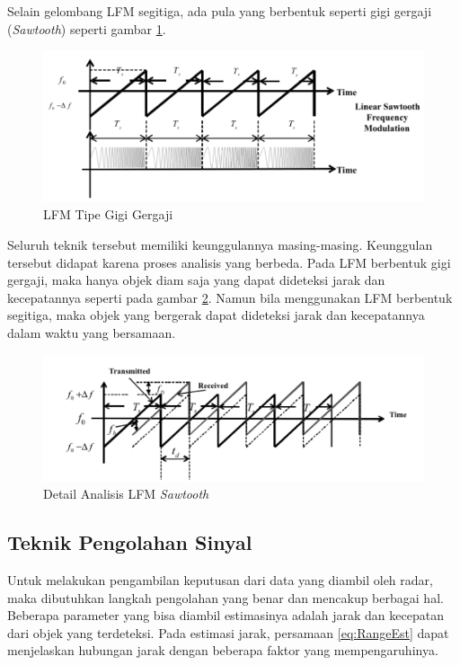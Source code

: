 Selain gelombang LFM segitiga, ada pula yang berbentuk seperti gigi gergaji (\textit{Sawtooth}) seperti gambar \ref{pic:lfmSaw}.

\begin{figure}
	\begin{center}
		\includegraphics[scale=0.65]{pics/bab2/lfmSawtooth.png}
		\caption[LFM Tipe Gigi Gergaji]{LFM Tipe Gigi Gergaji \cite{Jankiraman2018}}
		\label{pic:lfmSaw}
	\end{center}
\end{figure}

Seluruh teknik tersebut memiliki keunggulannya masing-masing. Keunggulan tersebut didapat karena proses analisis yang berbeda. Pada LFM berbentuk gigi gergaji, maka hanya objek diam saja yang dapat dideteksi jarak dan kecepatannya seperti pada gambar \ref{pic:lfmDetail}. Namun bila menggunakan LFM berbentuk segitiga, maka objek yang bergerak dapat dideteksi jarak dan kecepatannya dalam waktu yang bersamaan.

\begin{figure}
	\begin{center}
		\includegraphics[scale=0.65]{pics/bab2/lfmDetail.png}
		\caption[Detail Analisis LFM \textit{Sawtooth}]{Detail Analisis LFM \textit{Sawtooth} \cite{Jankiraman2018}}
		\label{pic:lfmDetail}
	\end{center}
\end{figure}


\subsection{Teknik Pengolahan Sinyal}
Untuk melakukan pengambilan keputusan dari data yang diambil oleh radar, maka dibutuhkan langkah pengolahan yang benar dan mencakup berbagai hal. Beberapa parameter yang bisa diambil estimasinya adalah jarak dan kecepatan dari objek yang terdeteksi. Pada estimasi jarak, persamaan \ref{eq:RangeEst} dapat menjelaskan hubungan jarak dengan beberapa faktor yang mempengaruhinya.

